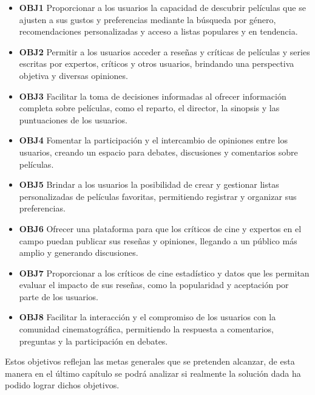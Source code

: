 \begin{itemize}
    \item \textbf{OBJ1} Proporcionar a los usuarios la capacidad de descubrir películas que se ajusten a sus gustos y preferencias mediante la búsqueda por género, recomendaciones personalizadas y acceso a listas populares y en tendencia.
    \item \textbf{OBJ2} Permitir a los usuarios acceder a reseñas y críticas de películas y series escritas por expertos, críticos y otros usuarios, brindando una perspectiva objetiva y diversas opiniones.
    \item \textbf{OBJ3} Facilitar la toma de decisiones informadas al ofrecer información completa sobre películas, como el reparto, el director, la sinopsis y las puntuaciones de los usuarios.
    \item \textbf{OBJ4} Fomentar la participación y el intercambio de opiniones entre los usuarios, creando un espacio para debates, discusiones y comentarios sobre películas.
    \item \textbf{OBJ5} Brindar a los usuarios la posibilidad de crear y gestionar listas personalizadas de películas favoritas, permitiendo registrar y organizar sus preferencias.
    \item \textbf{OBJ6} Ofrecer una plataforma para que los críticos de cine y expertos en el campo puedan publicar sus reseñas y opiniones, llegando a un público más amplio y generando discusiones.
    \item \textbf{OBJ7} Proporcionar a los críticos de cine estadístico y datos que les permitan evaluar el impacto de sus reseñas, como la popularidad y aceptación por parte de los usuarios.
    \item \textbf{OBJ8} Facilitar la interacción y el compromiso de los usuarios con la comunidad cinematográfica, permitiendo la respuesta a comentarios, preguntas y la participación en debates.
\end{itemize}

Estos objetivos reflejan las metas generales que se pretenden alcanzar, de esta manera en el último capítulo se 
podrá analizar si realmente la solución dada ha podido lograr dichos objetivos.